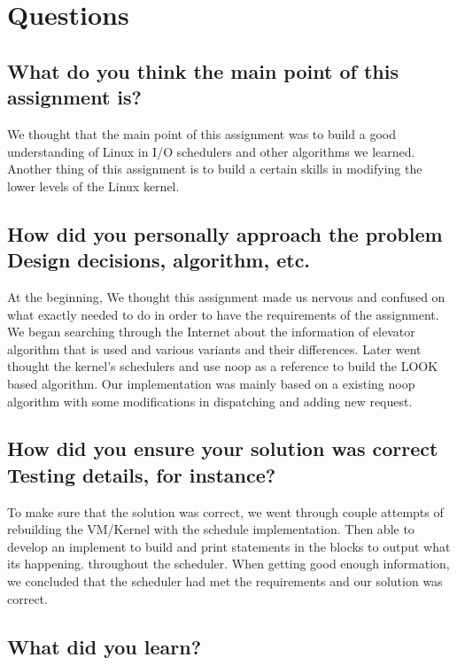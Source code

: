 \documentclass[onecolumn, draftclsnofoot, 10pt, titlepage, compsoc]{IEEEtran}
\begin{document}
\section{Questions}

\subsection{What do you think the main point of this assignment is?}

We thought that the main point of this assignment was to build a good understanding of Linux in I/O schedulers and other algorithms we learned. Another thing of this assignment is to build a certain skills in modifying the lower levels of the Linux kernel.\\

\subsection{How did you personally approach the problem Design decisions, algorithm, etc.}

At the beginning, We thought this assignment made us nervous and confused on what exactly needed to do in order to have the requirements of the assignment. We began searching through the Internet about the information of elevator algorithm that is used and various variants and their differences. Later went thought the kernel's schedulers and use noop as a reference to build the LOOK based algorithm. Our implementation was mainly based on a existing noop algorithm with some modifications in dispatching and adding new request.\\ 

\subsection{How did you ensure your solution was correct Testing details, for instance?}

To make sure that the solution was correct, we went through couple attempts of rebuilding the VM/Kernel with the schedule implementation. Then able to develop an implement to build and print statements in the blocks to output what its happening. throughout the scheduler. When getting good enough information, we concluded that the scheduler had met the requirements and our solution was correct. 

\subsection{What did you learn?}
\end{document}
